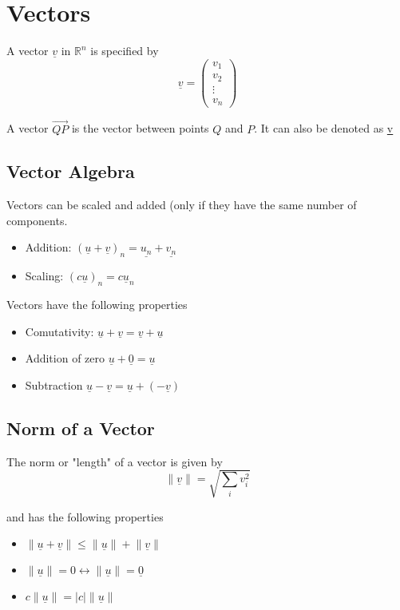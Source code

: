 \section{Vectors}
\begin{framed}
A vector $\underline{v}$ in  $\mathbb{R}^n$ is specified by \[
   \underline{v} = \begin{pmatrix} v_1\\v_2\\ \vdots \\ v_n
  \end{pmatrix}
\] 

A vector $\vec{QP}$ is the vector between points $Q$ and $P$. It can also be denoted as \underline{v}
\end{framed}

\subsection{Vector Algebra}
\begin{framed}

Vectors can be scaled and added (only if they have the same number of components.
   \begin{itemize}
      \item Addition: $(\underline{u} + \underline{v})_n = \underline{u_n} + \underline{v_n}$
      \item Scaling: $(c \underline{u})_n = c \underline{u}_n$
   \end{itemize}

Vectors have the following properties
\begin{itemize}
      \item Comutativity:  $ \underline{u} + \underline{v} = \underline{v} + \underline{u}$
      \item Addition of zero  $ \underline{u} + \underline{0} = \underline{u} $
      \item Subtraction  $ \underline{u} - \underline{v} = \underline{u} + (-\underline{v})$
\end{itemize}

\end{framed}



\subsection{Norm of a Vector}
\begin{framed}
The norm or "length" of a vector is given by \[
    \lVert \underline{v} \rVert = \sqrt{\sum_{i} v_i^2}
\] 

and has the following properties
   \begin{itemize}
      \item $ \lVert \underline{u} + \underline{v} \rVert \le \lVert \underline{u} \rVert + \lVert \underline{v} \rVert$
      \item $ \lVert \underline{u}\rVert = 0 \leftrightarrow \lVert \underline{u}\rVert = \underline{0} $
      \item $ c \lVert \underline{u}\rVert = |c| \lVert \underline{u}\rVert$
   \end{itemize}
\end{framed}




